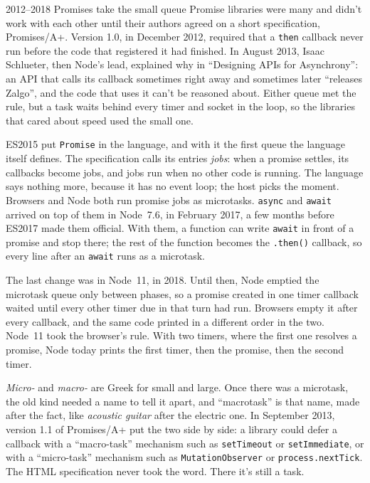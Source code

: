 \begin{history}{2012--2018 \textperiodcentered{} Promises take the small queue}
Promise libraries were many and didn't work with each other until their authors
agreed on a short specification, Promises/A+. Version 1.0, in December 2012,
required that a \texttt{then} callback never run before the code that
registered it had finished. In August 2013, Isaac
Schlueter, then Node's lead, explained why in ``Designing APIs for
Asynchrony'': an API that calls its callback sometimes right away and sometimes
later ``releases Zalgo'', and the code that uses it can't be reasoned about.
Either queue met the rule, but a task waits behind every timer and socket in
the loop, so the libraries that cared about speed used the small one.

ES2015 put \texttt{Promise} in the language, and with it the first queue the
language itself defines. The specification calls its entries \emph{jobs}: when
a promise settles, its callbacks become jobs, and jobs run when no other code
is running. The language says nothing more, because it has no event loop; the
host picks the moment. Browsers and Node both run promise jobs as microtasks.
\texttt{async} and \texttt{await} arrived on top of them in Node~7.6, in
February 2017, a few months before ES2017 made them official. With them, a
function can write \texttt{await} in front of a promise and stop there; the rest
of the function becomes the \texttt{.then()} callback, so every line after an
\texttt{await} runs as a microtask.

The last change was in Node~11, in 2018. Until then, Node emptied the microtask
queue only between phases, so a promise created in one timer callback waited
until every other timer due in that turn had run. Browsers empty it after every
callback, and the same code printed in a different order in the two. Node~11
took the browser's rule. With two timers, where the first one resolves a
promise, Node today prints the first timer, then the promise, then the second
timer.
\end{history}

\begin{etymology}
\emph{Micro-} and \emph{macro-} are Greek for small and large. Once there was a
microtask, the old kind needed a name to tell it apart, and ``macrotask'' is
that name, made after the fact, like \emph{acoustic guitar} after the electric
one. In September 2013, version 1.1 of Promises/A+ put the two side by side: a
library could defer a callback with a ``macro-task'' mechanism such as
\texttt{setTimeout} or \texttt{setImmediate}, or with a ``micro-task'' mechanism
such as \texttt{MutationObserver} or \texttt{process.nextTick}. The HTML
specification never took the word. There it's still a task.
\end{etymology}

